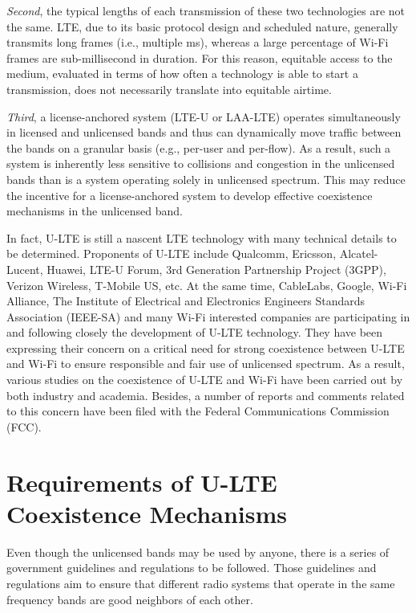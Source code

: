 \textit{Second}, the typical lengths of each transmission of these two technologies are not the same. LTE, due to its basic protocol design and scheduled nature, generally transmits long frames (i.e., multiple ms), whereas a large percentage of Wi-Fi frames are sub-millisecond in duration. For this reason, equitable access to the medium, evaluated in terms of how often a technology is able to start a transmission, does not necessarily translate into equitable airtime.

\textit{Third}, a license-anchored system (LTE-U or LAA-LTE) operates simultaneously in licensed and unlicensed bands and thus can dynamically move traffic between the bands on a granular basis (e.g., per-user and per-flow). As a result, such a system is inherently less sensitive to collisions and congestion in the unlicensed bands than is a system operating solely in unlicensed spectrum. This may reduce the incentive for a license-anchored system to develop effective coexistence mechanisms in the unlicensed band.

In fact, U-LTE is still a nascent LTE technology with many technical details to be determined. Proponents of U-LTE include Qualcomm, Ericsson, Alcatel-Lucent, Huawei, LTE-U Forum, 3rd Generation Partnership Project (3GPP), Verizon Wireless, T-Mobile US, etc. At the same time, CableLabs, Google, Wi-Fi Alliance, The Institute of Electrical and Electronics Engineers Standards Association (IEEE-SA) and many Wi-Fi interested companies are participating in and following closely the development of U-LTE technology. They have been expressing their concern on a critical need for strong coexistence between U-LTE and Wi-Fi to ensure responsible and fair use of unlicensed spectrum. As a result, various studies on the coexistence of U-LTE and Wi-Fi have been carried out by both industry and academia. Besides, a number of reports and comments related to this concern have been filed with the Federal Communications Commission (FCC).

\section{Requirements of U-LTE Coexistence Mechanisms}
\label{reqs}
Even though the unlicensed bands may be used by anyone, there is a series of government guidelines and regulations to be followed. Those guidelines and regulations aim to ensure that different radio systems that operate in the same frequency bands are good neighbors of each other.

